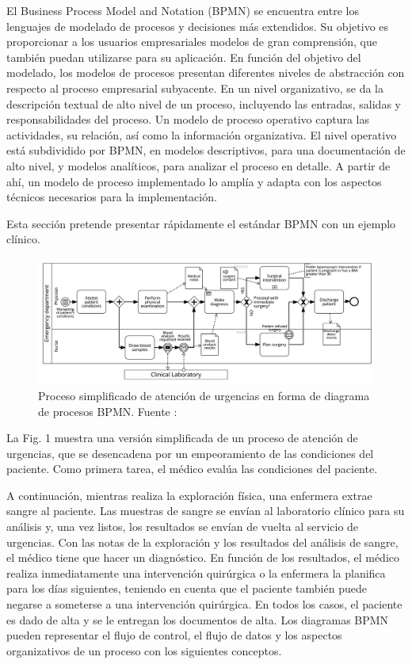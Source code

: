 El Business Process Model and Notation (BPMN) se encuentra entre los lenguajes de modelado de procesos y decisiones más extendidos. Su objetivo es proporcionar a los usuarios empresariales modelos de gran comprensión, que también puedan utilizarse para su aplicación. En función del objetivo del modelado, los modelos de procesos presentan diferentes niveles de abstracción con respecto al proceso empresarial subyacente. En un nivel organizativo, se da la descripción textual de alto nivel de un proceso, incluyendo las entradas, salidas y responsabilidades del proceso. Un modelo de proceso operativo captura las actividades, su relación, así como la información organizativa. El nivel operativo está subdividido por BPMN, en modelos descriptivos, para una documentación de alto nivel, y modelos analíticos, para analizar el proceso en detalle. A partir de ahí, un modelo de proceso implementado lo amplía y adapta con los aspectos técnicos necesarios para la implementación.

Esta sección pretende presentar rápidamente el estándar BPMN con un ejemplo clínico.

\begin{figure}[H]
    \centering
    \includegraphics[width=\textwidth]{img/bpmn.png}
    \caption{Proceso simplificado de atención de urgencias en forma de diagrama de procesos BPMN. Fuente : }
    \label{fig:bpmn}
\end{figure}

La Fig. 1 muestra una versión simplificada de un proceso de atención de urgencias, que se desencadena por un empeoramiento de las condiciones del paciente. Como primera tarea, el médico evalúa las condiciones del paciente.

A continuación, mientras realiza la exploración física, una enfermera extrae sangre al paciente. Las muestras de sangre se envían al laboratorio clínico para su análisis y, una vez listos, los resultados se envían de vuelta al servicio de urgencias. Con las notas de la exploración y los resultados del análisis de sangre, el médico tiene que hacer un diagnóstico. En función de los resultados, el médico realiza inmediatamente una intervención quirúrgica o la enfermera la planifica para los días siguientes, teniendo en cuenta que el paciente también puede negarse a someterse a una intervención quirúrgica. En todos los casos, el paciente es dado de alta y se le entregan los documentos de alta. Los diagramas BPMN pueden representar el flujo de control, el flujo de datos y los aspectos organizativos de un proceso con los siguientes conceptos.

